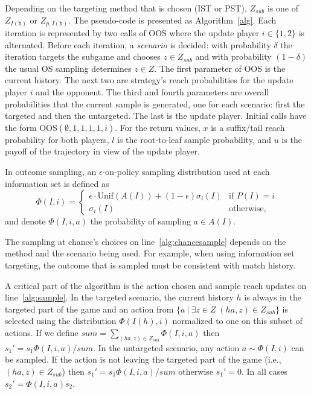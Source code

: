 \documentclass[letterpaper]{article}
\newcommand{\tth}{\mathtt{h}}
\begin{document}
Depending on the targeting method that is chosen (IST or PST), $Z_{sub}$ is one of $Z_{I(\tth)}$ or $Z_{p,I(\tth)}$. 
The pseudo-code is presented as Algorithm~\ref{alg}. 
Each iteration is represented by two calls of OOS where the update player $i \in \{1,2\}$ is alternated. 
Before each iteration, a {\it scenario} is decided: 
with probability $\delta$ the iteration targets the subgame and chooses $z \in Z_{sub}$
and with probability $(1-\delta)$ the usual OS sampling determines $z \in Z$. 
The first parameter of OOS is the current history. 
The next two are strategy's reach probabilities for the update player $i$ and the opponent. 
The third and fourth parameters are overall probabilities that the current sample is generated, one for each scenario: first the targeted and then the untargeted.
The last is the update player. Initial calls have the form OOS$(\emptyset, 1, 1, 1, 1, i)$.  
For the return values, $x$ is a suffix/tail reach probability for both players, 
$l$ is the root-to-leaf sample probability, and $u$ is the payoff of the trajectory in view 
of the update player. 

In outcome sampling, an $\epsilon$-on-policy sampling distribution used at each information set
is defined as 
\begin{equation*}
\label{eq:ossample}
\Phi(I,i) = \left\{
\begin{array}{ll}
\epsilon \cdot \mbox{Unif}(A(I)) + (1-\epsilon)\sigma_i(I) & \mbox{if } P(I) = i\\ 
\sigma_i(I)                                          & \mbox{otherwise,}
\end{array} \right.
\end{equation*}
and denote $\Phi(I,i,a)$ the probability of sampling $a \in A(I)$. 

The sampling at chance's choices on line~\ref{alg:chancesample} depends on the method and the scenario being used. For example, when using information set targeting, the outcome that is sampled must be consistent with match history.

A critical part of the algorithm is the action chosen and sample reach updates on line~\ref{alg:sample}. In the targeted scenario, the current history $h$ is always in the targeted part of the game and an action from $\{a~|~\exists z\in Z \; (ha,z)\in Z_{sub}\}$ is selected using the distribution $\Phi(I(h),i)$ normalized to one on this subset of actions. If we define $sum=\sum_{(ha,z)\in Z_{sub}}\Phi(I,i,a)$ then $s_1' = s_1\Phi(I,i,a)/sum$. In the untargeted scenario, any action $a \sim \Phi(I,i)$ can be sampled. If the action is not leaving the targeted part of the game (i.e., $(ha,z)\in Z_{sub}$) then $s_1' = s_1\Phi(I,i,a)/sum$ otherwise $s_1'=0$. In all cases $s_2' = \Phi(I,i,a) s_2$.
\end{document}
